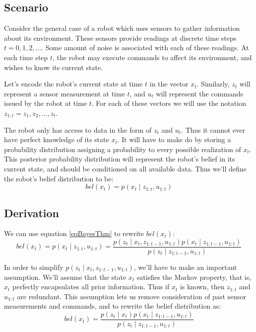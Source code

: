 \subsection{Scenario}
Consider the general case of a robot which uses sensors to gather information about its environment. These sensors provide readings at discrete time steps \(t=0,1,2,...\). Some amount of noise is associated with each of these readings. At each time step \(t\), the robot may execute commands to affect its environment, and wishes to know its current state.

Let's encode the robot's current state at time \(t\) in the vector \(x_t\). Similarly, \(z_t\) will represent a sensor measurement at time \(t\), and \(u_t\) will represent the commands issued by the robot at time \(t\). For each of these vectors we will use the notation \(z_{1:t} = z_1, z_2, ..., z_t\). 

The robot only has access to data in the form of \(z_t\) and \(u_t\). Thus it cannot ever have perfect knowledge of its state \(x_t\). It will have to make do by storing a probability distribution assigning a probability to every possible realization of \(x_t\). This posterior probability distribution will represent the robot's belief in its current state, and should be conditioned on all available data. Thus we'll define the robot's belief distribution to be:
\begin{equation} \label{eqBel}
bel(x_t) = p(x_t \mathbin{\vert} z_{1:t}, u_{1:t})
\end{equation}

\subsection{Derivation}

We can use equation \ref{eqBayesThm} to rewrite \(bel(x_t)\):
\begin{equation}
bel(x_t) = p(x_t \mathbin{\vert} z_{1:t}, u_{1:t}) = \frac{p(z_t \mathbin{\vert} x_t, z_{1:t-1}, u_{1:t})p(x_t \mathbin{\vert} z_{1:t-1}, u_{1:t})}{p(z_t \mathbin{\vert} z_{1:t-1}, u_{1:t})}
\end{equation}

In order to simplify \(p(z_t \mathbin{\vert} x_t, z_{1:t-1}, u_{1:t})\), we'll have to make an important assumption. We'll assume that the state \(x_t\) satisfies the Markov property, that is, \(x_t\) perfectly encapsulates all prior information. Thus if \(x_t\) is known, then \(z_{1:t}\) and \(u_{1:t}\) are redundant. This assumption lets us remove consideration of past sensor measurements and commands, and to rewrite the belief distribution as:
\begin{equation}
bel(x_t) = \frac{p(z_t \mathbin{\vert} x_t)p(x_t \mathbin{\vert} z_{1:t-1}, u_{1:t})}{p(z_t \mathbin{\vert} z_{1:t-1}, u_{1:t})}
\end{equation}

